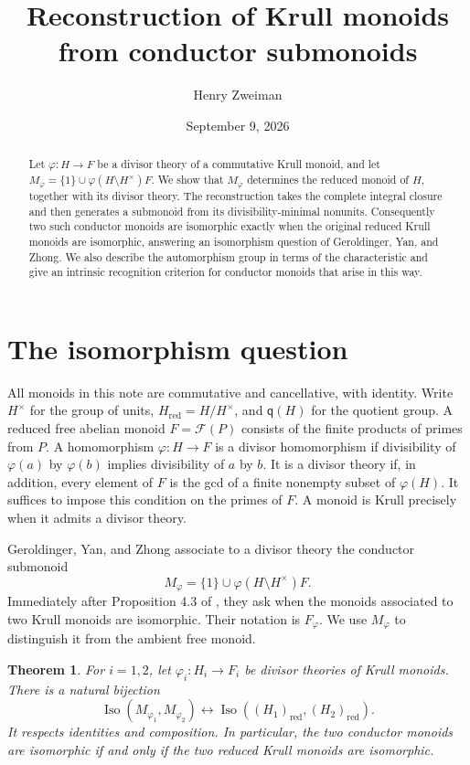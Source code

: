 \documentclass[11pt]{article}
\title{Reconstruction of Krull monoids from conductor submonoids}
\author{Henry Zweiman}
\date{September 9, 2026}
\newtheorem{theorem}{Theorem}[section]
\theoremstyle{definition}
\newcommand{\q}{\mathsf q}
\begin{document}
\maketitle
\begin{abstract}
Let $\varphi:H\to F$ be a divisor theory of a commutative Krull monoid, and let $M_\varphi=\{1\}\cup\varphi(H\setminus H^\times)F$. We show that $M_\varphi$ determines the reduced monoid of $H$, together with its divisor theory. The reconstruction takes the complete integral closure and then generates a submonoid from its divisibility-minimal nonunits. Consequently two such conductor monoids are isomorphic exactly when the original reduced Krull monoids are isomorphic, answering an isomorphism question of Geroldinger, Yan, and Zhong. We also describe the automorphism group in terms of the characteristic and give an intrinsic recognition criterion for conductor monoids that arise in this way.
\end{abstract}

\section{The isomorphism question}

All monoids in this note are commutative and cancellative, with identity. Write $H^\times$ for the group of units, $H_{\mathrm{red}}=H/H^\times$, and $\q(H)$ for the quotient group. A reduced free abelian monoid $F=\mathcal F(P)$ consists of the finite products of primes from $P$. A homomorphism $\varphi:H\to F$ is a divisor homomorphism if divisibility of $\varphi(a)$ by $\varphi(b)$ implies divisibility of $a$ by $b$. It is a divisor theory if, in addition, every element of $F$ is the gcd of a finite nonempty subset of $\varphi(H)$. It suffices to impose this condition on the primes of $F$. A monoid is Krull precisely when it admits a divisor theory.

Geroldinger, Yan, and Zhong associate to a divisor theory the conductor submonoid
\begin{equation}\label{eq:construction}
 M_\varphi=\{1\}\cup\varphi(H\setminus H^\times)F.
\end{equation}
Immediately after Proposition 4.3 of \cite{GYZ}, they ask when the monoids associated to two Krull monoids are isomorphic. Their notation is $F_\varphi$. We use $M_\varphi$ to distinguish it from the ambient free monoid.

\begin{theorem}\label{thm:main}
For $i=1,2$, let $\varphi_i:H_i\to F_i$ be divisor theories of Krull monoids. There is a natural bijection
\[
 \operatorname{Iso}(M_{\varphi_1},M_{\varphi_2})
 \longleftrightarrow
 \operatorname{Iso}((H_1)_{\mathrm{red}},(H_2)_{\mathrm{red}}).
\]
It respects identities and composition. In particular, the two conductor monoids are isomorphic if and only if the two reduced Krull monoids are isomorphic.
\end{theorem}
\end{document}
